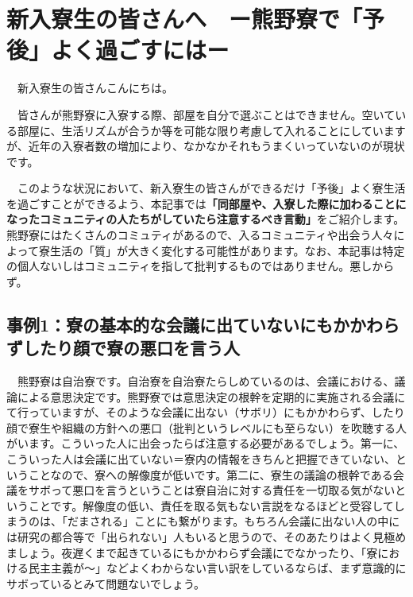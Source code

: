 \section{新入寮生の皆さんへ　ー熊野寮で「予後」よく過ごすにはー}

　新入寮生の皆さんこんにちは。

　皆さんが熊野寮に入寮する際、部屋を自分で選ぶことはできません。空いている部屋に、生活リズムが合うか等を可能な限り考慮して入れることにしていますが、近年の入寮者数の増加により、なかなかそれもうまくいっていないのが現状です。

　このような状況において、新入寮生の皆さんができるだけ「予後」よく寮生活を過ごすことができるよう、本記事では\textbf{「同部屋や、入寮した際に加わることになったコミュニティの人たちがしていたら注意するべき言動」}をご紹介します。熊野寮にはたくさんのコミュティがあるので、入るコミュニティや出会う人々によって寮生活の「質」が大きく変化する可能性があります。なお、本記事は特定の個人ないしはコミュニティを指して批判するものではありません。悪しからず。

\subsection{事例1：寮の基本的な会議に出ていないにもかかわらずしたり顔で寮の悪口を言う人}
　熊野寮は自治寮です。自治寮を自治寮たらしめているのは、会議における、議論による意思決定です。熊野寮では意思決定の根幹を定期的に実施される会議にて行っていますが、そのような会議に出ない（サボリ）にもかかわらず、したり顔で寮生や組織の方針への悪口（批判というレベルにも至らない）を吹聴する人がいます。こういった人に出会ったらば注意する必要があるでしょう。第一に、こういった人は会議に出ていない＝寮内の情報をきちんと把握できていない、ということなので、寮への解像度が低いです。第二に、寮生の議論の根幹である会議をサボって悪口を言うということは寮自治に対する責任を一切取る気がないということです。解像度の低い、責任を取る気もない言説をなるほどと受容してしまうのは、「だまされる」ことにも繋がります。もちろん会議に出ない人の中には研究の都合等で「出られない」人もいると思うので、そのあたりはよく見極めましょう。夜遅くまで起きているにもかかわらず会議にでなかったり、「寮における民主主義が～」などよくわからない言い訳をしているならば、まず意識的にサボっているとみて問題ないでしょう。


